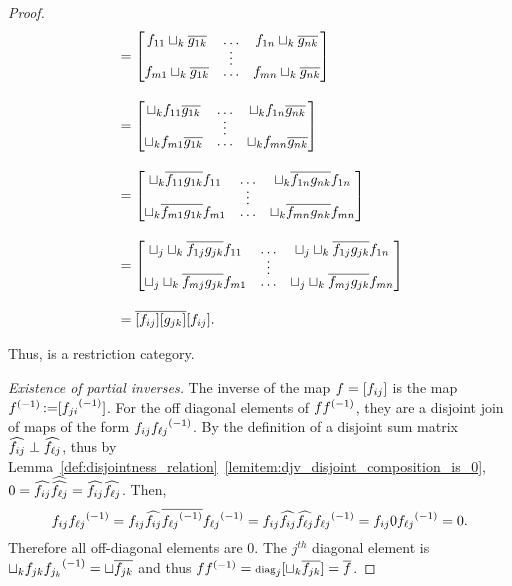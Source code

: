 \begin{proof}
\begin{align*}
      & = \begin{bmatrix}
        f_{11}\djoin_k \rst{g_{1 k}} &\ldots & f_{1n}\djoin_k \rst{g_{n k}} \\[-4pt]
        & \vdots & \\[-4pt]
        f_{m1}\djoin_k \rst{g_{1 k}} &\ldots & f_{m n}\djoin_k \rst{g_{n k}}
      \end{bmatrix}\\[10pt]
      & = \begin{bmatrix}
        \djoin_k f_{11}\rst{g_{1 k}} &\ldots & \djoin_k f_{1n}\rst{g_{n k}} \\[-4pt]
        & \vdots & \\[-4pt]
        \djoin_k f_{m1}\rst{g_{1 k}} &\ldots & \djoin_k f_{m n}\rst{g_{n k}}
      \end{bmatrix}\\[10pt]
      & = \begin{bmatrix}
        \djoin_k \rst{f_{11} g_{1 k}} f_{11} &\ldots & \djoin_k \rst{f_{1n} g_{n k}} f_{1n}\\[-4pt]
        & \vdots & \\[-4pt]
        \djoin_k \rst{f_{m1} g_{1 k}}f_{m1} &\ldots & \djoin_k \rst{f_{m n} g_{n k}}f_{m n}
      \end{bmatrix}\\[10pt]
      & = \begin{bmatrix} %
        \djoin_\jay\djoin_k \rst{f_{1\jay} g_{\jay k}} f_{11} &\ldots &
          \djoin_\jay\djoin_k \rst{f_{1\jay} g_{\jay k}} f_{1n}\\[-4pt]
        & \vdots & \\[-4pt]
        \djoin_\jay\djoin_k \rst{f_{m\jay} g_{\jay k}}f_{m1} &\ldots &
          \djoin_\jay\djoin_k \rst{f_{m \jay} g_{\jay k}}f_{m n}
      \end{bmatrix}\\[10pt]
      &= \rst{[f_{i\jay}][g_{\jay k}]} [f_{i\jay}].
  \end{align*}

  Thus, \imatx is a restriction category.

  \emph{Existence of partial inverses.}
  The inverse of the map $f = [f_{ij}]$ is the map ${f}^{(-1)}\operatorname*{:\!=}[{f_{j i}}^{(-1)}]$.
  For the off diagonal elements of $f {f}^{(-1)}$, they are a disjoint join of \X maps of the form
  $f_{i j} {f_{\ell j}}^{(-1)}$. By the definition of a disjoint sum matrix $\widehat{f_{i j}} \perp
  \widehat{f_{\ell j}}$, thus by
  Lemma~\ref{def:disjointness_relation}~\ref{lemitem:djv_disjoint_composition_is_0},
  $0 = \widehat{f_{i j}} \widehat{\widehat{f_{\ell j}}} =\widehat{f_{i j}} \widehat{f_{\ell j}}$. Then,
  \[
    f_{i j} {f_{\ell j}}^{(-1)} =   f_{i j}\widehat{f_{i j}} \overline{{f_{\ell j}}^{(-1)}} {f_{\ell j}}^{(-1)}
      =   f_{i j}\widehat{f_{i j}} \widehat{f_{\ell j}} {f_{\ell j}}^{(-1)} =  f_{i j} 0  {f_{\ell j}}^{(-1)}
      = 0.
  \]
  Therefore all off-diagonal elements are $0$. The $j^{th}$
  diagonal element is $\sqcup_k f_{j k}{f_{j_k}}^{(-1)} = \sqcup \overline{f_{j k}}$ and thus
  $f{f}^{(-1)} = \operatorname{\scriptstyle{diag}}_j [\sqcup_k \overline{f_{j k}}] = \overline{f}$.
\end{proof}

